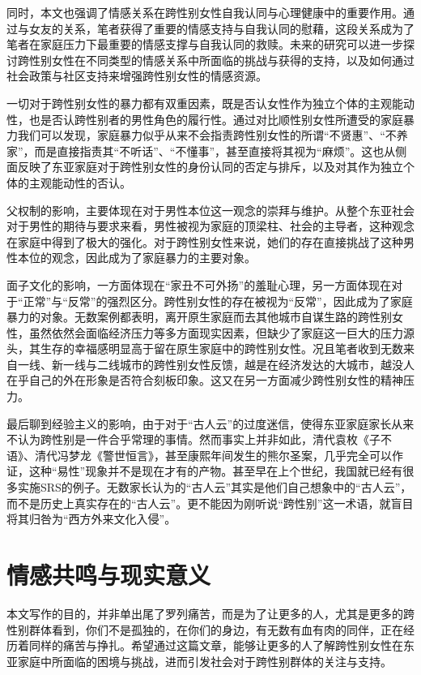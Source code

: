\documentclass[twocolumn]{ctexart}
\begin{document}
同时，本文也强调了情感关系在跨性别女性自我认同与心理健康中的重要作用。通过与女友的关系，笔者获得了重要的情感支持与自我认同的慰藉，这段关系成为了笔者在家庭压力下最重要的情感支撑与自我认同的救赎。未来的研究可以进一步探讨跨性别女性在不同类型的情感关系中所面临的挑战与获得的支持，以及如何通过社会政策与社区支持来增强跨性别女性的情感资源。

一切对于跨性别女性的暴力都有双重因素，既是否认女性作为独立个体的主观能动性，也是否认跨性别者的男性角色的履行性。通过对比顺性别女性所遭受的家庭暴力我们可以发现，家庭暴力似乎从来不会指责跨性别女性的所谓“不贤惠”、“不养家”，而是直接指责其“不听话”、“不懂事”，甚至直接将其视为“麻烦”。这也从侧面反映了东亚家庭对于跨性别女性的身份认同的否定与排斥，以及对其作为独立个体的主观能动性的否认\cite{amnesty2019transmedical}。

父权制的影响，主要体现在对于男性本位这一观念的崇拜与维护。从整个东亚社会对于男性的期待与要求来看，男性被视为家庭的顶梁柱、社会的主导者，这种观念在家庭中得到了极大的强化。对于跨性别女性来说，她们的存在直接挑战了这种男性本位的观念，因此成为了家庭暴力的主要对象。

面子文化的影响，一方面体现在“家丑不可外扬”的羞耻心理，另一方面体现在对于“正常”与“反常”的强烈区分。跨性别女性的存在被视为“反常”，因此成为了家庭暴力的对象。无数案例都表明，离开原生家庭而去其他城市自谋生路的跨性别女性，虽然依然会面临经济压力等多方面现实因素，但缺少了家庭这一巨大的压力源头，其生存的幸福感明显高于留在原生家庭中的跨性别女性。况且笔者收到无数来自一线、新一线与二线城市的跨性别女性反馈，越是在经济发达的大城市，越没人在乎自己的外在形象是否符合刻板印象。这又在另一方面减少跨性别女性的精神压力。

最后聊到经验主义的影响，由于对于“古人云”的过度迷信，使得东亚家庭家长从来不认为跨性别是一件合乎常理的事情。然而事实上并非如此，清代袁枚《子不语》、清代冯梦龙《警世恒言》，甚至康熙年间发生的熊尔圣案，几乎完全可以作证，这种“易性”现象并不是现在才有的产物\cite{pan2023gendertrouble}。甚至早在上个世纪，我国就已经有很多实施SRS的例子\cite{wuxingren2005heqinglian}。无数家长认为的“古人云”其实是他们自己想象中的“古人云”，而不是历史上真实存在的“古人云”。更不能因为刚听说“跨性别”这一术语，就盲目将其归咎为“西方外来文化入侵”。

\section{情感共鸣与现实意义}
本文写作的目的，并非单出尾了罗列痛苦，而是为了让更多的人，尤其是更多的跨性别群体看到，你们不是孤独的，在你们的身边，有无数有血有肉的同伴，正在经历着同样的痛苦与挣扎。希望通过这篇文章，能够让更多的人了解跨性别女性在东亚家庭中所面临的困境与挑战，进而引发社会对于跨性别群体的关注与支持。
\end{document}
